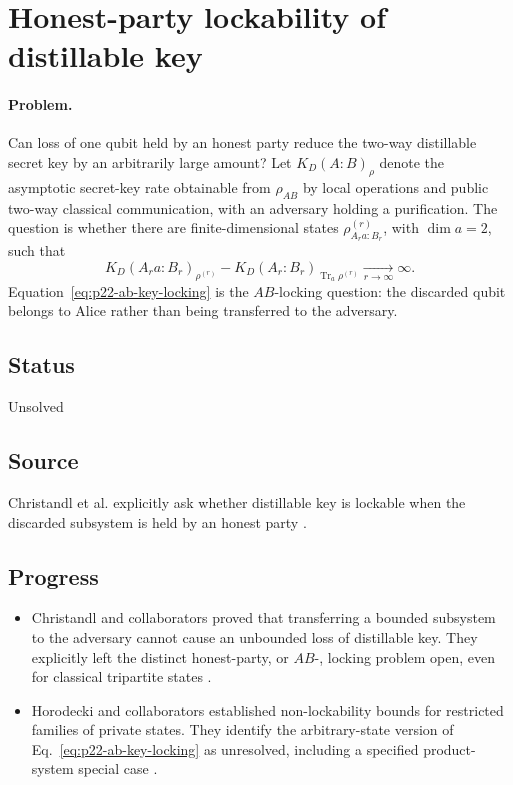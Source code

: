 \section{Honest-party lockability of distillable key}
\label{sec:op_f1e5a1cad168b38b}

\paragraph{Problem.}
Can loss of one qubit held by an honest party reduce the two-way distillable
secret key by an arbitrarily large amount?  Let $K_D(A:B)_\rho$ denote the
asymptotic secret-key rate obtainable from $\rho_{AB}$ by local operations and
public two-way classical communication, with an adversary holding a
purification.  The question is whether there are finite-dimensional states
$\rho^{(r)}_{A_ra:B_r}$, with $\dim a=2$, such that
\begin{equation}
  K_D(A_ra:B_r)_{\rho^{(r)}}
  -K_D(A_r:B_r)_{\operatorname{Tr}_a\rho^{(r)}}
  \xrightarrow[r\to\infty]{}\infty.
  \label{eq:p22-ab-key-locking}
\end{equation}
Equation~\eqref{eq:p22-ab-key-locking} is the $AB$-locking question: the
discarded qubit belongs to Alice rather than being transferred to the
adversary.

\subsection*{Status}

Unsolved

\subsection*{Source}

Christandl et al. explicitly ask whether distillable key is lockable when the
discarded subsystem is held by an honest party
.

\subsection*{Progress}

\begin{itemize}
  \item Christandl and collaborators proved that transferring a bounded
  subsystem to the adversary cannot cause an unbounded loss of distillable
  key.  They explicitly left the distinct honest-party, or $AB$-, locking
  problem open, even for classical tripartite states
  .

  \item Horodecki and collaborators established non-lockability bounds for
  restricted families of private states.  They identify the arbitrary-state
  version of Eq.~\eqref{eq:p22-ab-key-locking} as unresolved, including a
  specified product-system special case
  .
\end{itemize}

